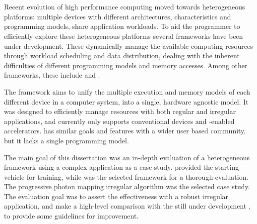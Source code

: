 \documentclass[main.tex]{subfiles}
\begin{document}
\cleardoublepage
{}
{}
\chapter*{\abstractname}

Recent evolution of high performance computing moved towards heterogeneous platforms: multiple devices with different architectures, characteristics and programming models, share application workloads. To aid the programmer to efficiently explore these heterogeneous platforms several frameworks have been under development. These dynamically manage the available computing resources through workload scheduling and data distribution, dealing with the inherent difficulties of different programming models and memory accesses. Among other frameworks, these include \gama and \starpu.

The \gama framework aims to unify the multiple execution and memory models of each different device in a computer system, into a single, hardware agnostic model. It was designed to efficiently manage resources with both regular and irregular applications, and currently only supports conventional \cpu devices and \cuda-enabled accelerators. \starpu has similar goals and features with a wider user based community, but it lacks a single programming model.

The main goal of this dissertation was an in-depth evaluation of a heterogeneous framework using a complex application as a case study. \gama provided the starting vehicle for training, while \starpu was the selected framework for a thorough evaluation. The progressive photon mapping irregular algorithm was the selected case study. The evaluation goal was to assert the \starpu effectiveness with a robust irregular application, and make a high-level comparison with the still under development \gama, to provide some guidelines for \gama improvement.

\end{document}
